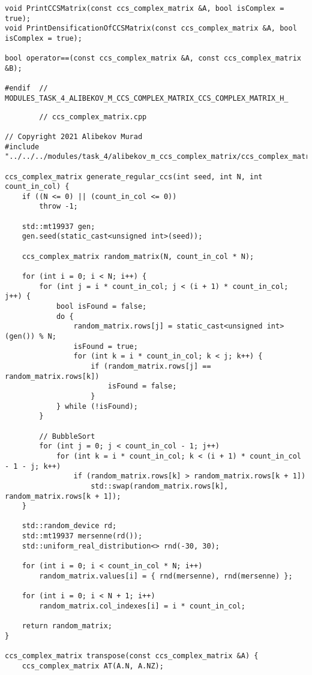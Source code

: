 \documentclass{report}
\begin{document}
\begin{itemize}
\begin{itemize}
\begin{lstlisting}
void PrintCCSMatrix(const ccs_complex_matrix &A, bool isComplex = true);
void PrintDensificationOfCCSMatrix(const ccs_complex_matrix &A, bool isComplex = true);

bool operator==(const ccs_complex_matrix &A, const ccs_complex_matrix &B);

#endif  // MODULES_TASK_4_ALIBEKOV_M_CCS_COMPLEX_MATRIX_CCS_COMPLEX_MATRIX_H_
	\end{lstlisting}
	\begin{lstlisting}
		// ccs_complex_matrix.cpp

// Copyright 2021 Alibekov Murad
#include "../../../modules/task_4/alibekov_m_ccs_complex_matrix/ccs_complex_matrix.h"

ccs_complex_matrix generate_regular_ccs(int seed, int N, int count_in_col) {
    if ((N <= 0) || (count_in_col <= 0))
        throw -1;

    std::mt19937 gen;
    gen.seed(static_cast<unsigned int>(seed));

    ccs_complex_matrix random_matrix(N, count_in_col * N);

    for (int i = 0; i < N; i++) {
        for (int j = i * count_in_col; j < (i + 1) * count_in_col; j++) {
            bool isFound = false;
            do {
                random_matrix.rows[j] = static_cast<unsigned int>(gen()) % N;
                isFound = true;
                for (int k = i * count_in_col; k < j; k++) {
                    if (random_matrix.rows[j] == random_matrix.rows[k])
                        isFound = false;
                    }
            } while (!isFound);
        }

        // BubbleSort
        for (int j = 0; j < count_in_col - 1; j++)
            for (int k = i * count_in_col; k < (i + 1) * count_in_col - 1 - j; k++)
                if (random_matrix.rows[k] > random_matrix.rows[k + 1])
                    std::swap(random_matrix.rows[k], random_matrix.rows[k + 1]);
    }

    std::random_device rd;
    std::mt19937 mersenne(rd());
    std::uniform_real_distribution<> rnd(-30, 30);

    for (int i = 0; i < count_in_col * N; i++)
        random_matrix.values[i] = { rnd(mersenne), rnd(mersenne) };

    for (int i = 0; i < N + 1; i++)
        random_matrix.col_indexes[i] = i * count_in_col;

    return random_matrix;
}

ccs_complex_matrix transpose(const ccs_complex_matrix &A) {
    ccs_complex_matrix AT(A.N, A.NZ);


\end{lstlisting}
\end{itemize}
\end{itemize}
\end{document}
